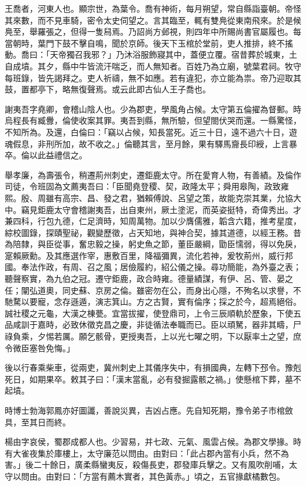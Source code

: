 \begin{pinyinscope}
王喬者，河東人也。顯宗世，為葉令。喬有神術，每月朔望，常自縣詣臺朝。帝怪其來數，而不見車騎，密令太史伺望之。言其臨至，輒有雙鳧從東南飛來。於是候鳧至，舉羅張之，但得一隻舄焉。乃詔尚方邺視，則四年中所賜尚書官屬履也。每當朝時，葉門下鼓不擊自鳴，聞於京師。後天下玉棺於堂前，吏人推排，終不搖動。喬曰：「天帝獨召我邪？」乃沐浴服飾寢其中，蓋便立覆。宿昔葬於城東，土自成墳。其夕，縣中牛皆流汗喘乏，而人無知者。百姓乃為立廟，號葉君祠。牧守每班錄，皆先謁拜之。吏人祈禱，無不如應。若有違犯，亦立能為祟。帝乃迎取其鼓，置都亭下，略無復聲焉。或云此即古仙人王子喬也。

謝夷吾字堯卿，會稽山陰人也。少為郡吏，學風角占候。太守第五倫擢為督郵。時烏程長有臧釁，倫使收案其罪。夷吾到縣，無所驗，但望閤伏哭而還。一縣驚怪，不知所為。及還，白倫曰：「竊以占候，知長當死。近三十日，遠不過六十日，遊魂假息，非刑所加，故不收之。」倫聽其言，至月餘，果有驛馬齎長印綬，上言暴卒。倫以此益禮信之。

舉孝廉，為壽張令，稍遷荊州刺史，遷鉅鹿太守。所在愛育人物，有善績。及倫作司徒，令班固為文薦夷吾曰：「臣聞堯登稷、契，政隆太平；舜用皋陶，政致雍熙。殷、周雖有高宗、昌、發之君，猶賴傅說、呂望之策，故能克崇其業，允協大中。竊見鉅鹿太守會稽謝夷吾，出自東州，厥土塗泥，而英姿挺特，奇偉秀出。才兼四科，行包九德，仁足濟時，知周萬物。加以少膺儒雅，韜含六籍，推考星度，綜校圖錄，探賾聖祕，觀變歷徵，占天知地，與神合契，據其道德，以經王務。昔為陪隸，與臣從事，奮忠毅之操，躬史魚之節，董臣嚴綱，勖臣懦弱，得以免戾，寔賴厥勳。及其應選作宰，惠敷百里，降福彌異，流化若神，爰牧荊州，威行邦國。奉法作政，有周、召之風；居儉履約，紹公儀之操。尋功簡能，為外臺之表；聽聲察實，為九伯之冠。遷守鉅鹿，政合時雍。德量績謀，有伊、呂、管、晏之任；闡弘道奧，同史蘇、京房之倫。雖密勿在公，而身出心隱，不殉名以求譽，不馳騖以要寵，念存遜遁，演志箕山。方之古賢，實有倫序；採之於今，超焉絕俗。誠社稷之元龜，大漢之棟甍。宜當拔擢，使登鼎司，上令三辰順軌於歷象，下使五品咸訓于嘉時，必致休徵克昌之慶，非徒循法奉職而已。臣以頑駑，器非其疇，尸祿負乘，夕惕若厲。願乞骸骨，更授夷吾，上以光七曜之明，下以厭率土之望，庶令微臣塞咎免悔。」

後以行春乘柴車，從兩吏，冀州刺史上其儀序失中，有損國典，左轉下邳令。豫剋死日，如期果卒。敕其子曰：「漢末當亂，必有發掘露骸之禍。」使懸棺下葬，墓不起墳。

時博士勃海郭鳳亦好圖讖，善說災異，吉凶占應。先自知死期，豫令弟子市棺斂具，至其日而終。

楊由字哀侯，蜀郡成都人也。少習易，并七政、元氣、風雲占候。為郡文學掾。時有大雀夜集於庫樓上，太守廉范以問由。由對曰：「此占郡內當有小兵，然不為害。」後二十餘日，廣柔縣蠻夷反，殺傷長吏，郡發庫兵擊之。又有風吹削哺，太守以問由。由對曰：「方當有薦木實者，其色黃赤。」頃之，五官掾獻橘數包。


\end{pinyinscope}
